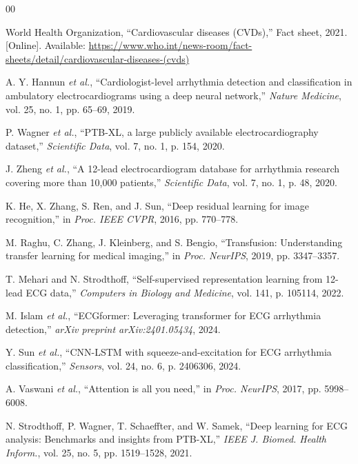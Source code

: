 \documentclass[journal]{IEEEtran}
\begin{document}
\begin{thebibliography}{00}

World Health Organization, ``Cardiovascular diseases (CVDs),'' Fact sheet, 2021. [Online]. Available: \url{https://www.who.int/news-room/fact-sheets/detail/cardiovascular-diseases-(cvds)}

A. Y. Hannun \textit{et al.}, ``Cardiologist-level arrhythmia detection and classification in ambulatory electrocardiograms using a deep neural network,'' \textit{Nature Medicine}, vol. 25, no. 1, pp. 65--69, 2019.

P. Wagner \textit{et al.}, ``PTB-XL, a large publicly available electrocardiography dataset,'' \textit{Scientific Data}, vol. 7, no. 1, p. 154, 2020.

J. Zheng \textit{et al.}, ``A 12-lead electrocardiogram database for arrhythmia research covering more than 10,000 patients,'' \textit{Scientific Data}, vol. 7, no. 1, p. 48, 2020.

K. He, X. Zhang, S. Ren, and J. Sun, ``Deep residual learning for image recognition,'' in \textit{Proc. IEEE CVPR}, 2016, pp. 770--778.

M. Raghu, C. Zhang, J. Kleinberg, and S. Bengio, ``Transfusion: Understanding transfer learning for medical imaging,'' in \textit{Proc. NeurIPS}, 2019, pp. 3347--3357.

T. Mehari and N. Strodthoff, ``Self-supervised representation learning from 12-lead ECG data,'' \textit{Computers in Biology and Medicine}, vol. 141, p. 105114, 2022.

M. Islam \textit{et al.}, ``ECGformer: Leveraging transformer for ECG arrhythmia detection,'' \textit{arXiv preprint arXiv:2401.05434}, 2024.

Y. Sun \textit{et al.}, ``CNN-LSTM with squeeze-and-excitation for ECG arrhythmia classification,'' \textit{Sensors}, vol. 24, no. 6, p. 2406306, 2024.

A. Vaswani \textit{et al.}, ``Attention is all you need,'' in \textit{Proc. NeurIPS}, 2017, pp. 5998--6008.

N. Strodthoff, P. Wagner, T. Schaeffter, and W. Samek, ``Deep learning
for ECG analysis: Benchmarks and insights from PTB-XL,'' \textit{IEEE
J. Biomed. Health Inform.}, vol. 25, no. 5, pp. 1519--1528, 2021.


\end{thebibliography}
\end{document}
